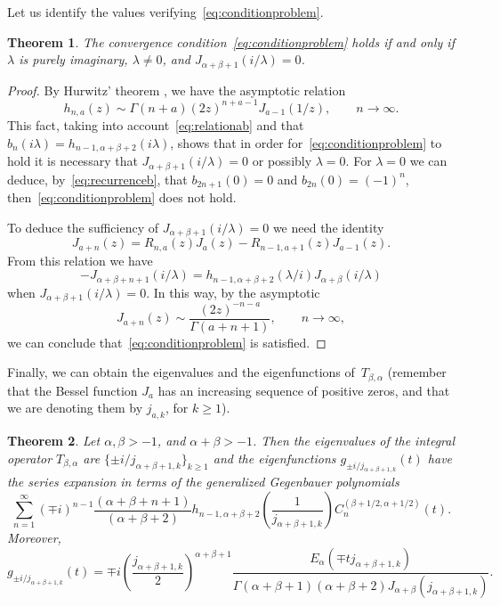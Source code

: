 \documentclass[12pt,a4paper]{amsart}
\theoremstyle{plain}
\newtheorem{Thm}{Theorem}
\theoremstyle{definition}
\begin{document}
Let us identify the values verifying~\eqref{eq:conditionproblem}.

\begin{Thm}
\label{thm:eigenvalues}
The convergence condition~\eqref{eq:conditionproblem} holds 
if and only if $\lambda$ is purely imaginary, $\lambda\not=0$, and
$J_{\alpha+\beta+1}(i/\lambda) = 0$.
\end{Thm}

\begin{proof}
By Hurwitz' theorem \cite[\S\,9.65, formula~(1), p.~302]{Wat}, we have
the asymptotic relation
\[
  h_{n,a}(z) \sim \Gamma(n+a) (2z)^{n+a-1}J_{a-1}(1/z),
  \qquad n\to\infty.
\]
This fact, taking into account~\eqref{eq:relationab} and that
$b_{n}(i\lambda) = h_{n-1,\alpha+\beta+2}(i\lambda)$, shows that in
order for~\eqref{eq:conditionproblem} to hold it is necessary that
$J_{\alpha+\beta+1}(i/\lambda) = 0$ or possibly $\lambda=0$. For
$\lambda=0$ we can deduce, by~\eqref{eq:recurrenceb}, that
$b_{2n+1}(0) = 0$ and $b_{2n}(0) = (-1)^n$, then~\eqref{eq:conditionproblem} 
does not hold.

To deduce the sufficiency of $J_{\alpha+\beta+1}(i/\lambda) = 0$ we
need the identity \cite[\S\,9.6, formula~(1), p.~295]{Wat}
\[
  J_{a+n}(z) = R_{n,a}(z)J_{a}(z)-R_{n-1,a+1}(z)J_{a-1}(z).
\]
From this relation we have
\begin{equation}
\label{eq:JH}
  -J_{\alpha+\beta+n+1}(i/\lambda)
  = h_{n-1,\alpha+\beta+2}(\lambda/i) J_{\alpha+\beta}(i/\lambda)
\end{equation}
when $J_{\alpha+\beta+1}(i/\lambda) = 0$. In this way, by the
asymptotic
\[
  J_{a+n}(z) \sim \frac{(2z)^{-n-a}}{\Gamma(a+n+1)},
  \qquad n\to\infty,
\]
we can conclude that~\eqref{eq:conditionproblem} is satisfied.
\end{proof}

Finally, we can obtain the eigenvalues and the eigenfunctions of~$T_{\beta,\alpha}$
(remember that the Bessel function $J_a$ has an increasing
sequence of positive zeros, and that we are denoting them by $j_{a,k}$, for $k\ge 1$).

\begin{Thm}
\label{thm:main}
Let $\alpha,\beta >-1$, and $\alpha+\beta>-1$. Then the
eigenvalues of the integral operator $T_{\beta,\alpha}$ are $\{\pm
i/j_{\alpha+\beta+1,k}\}_{k\ge 1}$ and the eigenfunctions $g_{\pm
i/j_{\alpha+\beta+1,k}}(t)$ have the series expansion in terms of
the generalized Gegenbauer polynomials
\begin{equation}
\label{eq:expanGegen}
  \sum_{n=1}^\infty (\mp i)^{n-1}
  \frac{(\alpha+\beta+n+1)}{(\alpha+\beta+2)}
  h_{n-1,\alpha+\beta+2} \left(\frac{1}{j_{\alpha+\beta+1,k}}\right)
  C_n^{(\beta+1/2,\alpha+1/2)}(t).
\end{equation}
Moreover,
\begin{equation}
\label{eq:eigenfin}
  g_{\pm i/j_{\alpha+\beta+1,k}}(t)
  = \mp i \left(\frac{j_{\alpha+\beta+1,k}}{2}\right)^{\alpha+\beta+1}
  \frac{E_\alpha(\mp t j_{\alpha+\beta+1,k})}{\Gamma(\alpha+\beta+1)(\alpha+\beta+2)
  J_{\alpha+\beta}(j_{\alpha+\beta+1,k})}.
\end{equation}
\end{Thm}
\end{document}
